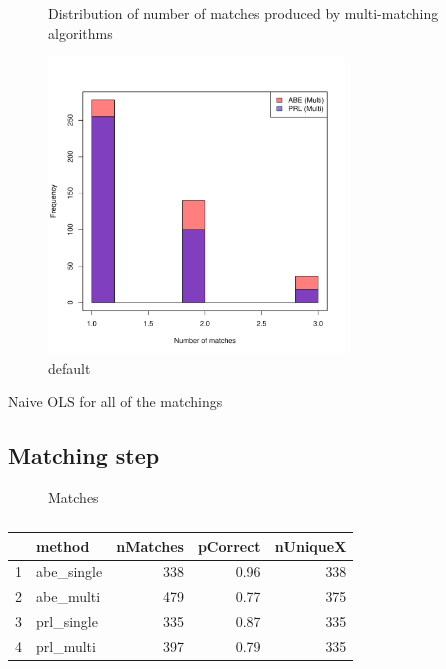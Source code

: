 \documentclass[12pt]{article}
\begin{document}
\begin{enumerate}
\begin{figure}[h!]
\begin{center}
\caption{Distribution of number of matches produced by multi-matching algorithms}
\vspace{-20pt}
\includegraphics[width=0.7\textwidth]{./Figures/match_hist.pdf}
\caption{default}
\label{default}
\end{center}
\end{figure}

\begin{table}[h!]
\let\center\empty
\let\endcenter\relax
\centering
\caption{Naive OLS for all of the matchings}
\resizebox{\textwidth}{!}{}
\end{table}

\subsection{Matching step}
\begin{figure}[htbp]
\caption{Matches}
\begin{center}


\label{default}
\end{center}
\end{figure}

\begin{table}[ht]
\centering
\caption{}
\vspace{5pt}
\begin{tabular}{rlrrr}
  \hline
 & method & nMatches & pCorrect & nUniqueX \\ 
  \hline
1 & abe\_single & 338 & 0.96 & 338 \\ 
  2 & abe\_multi & 479 & 0.77 & 375 \\ 
  3 & prl\_single & 335 & 0.87 & 335 \\ 
  4 & prl\_multi & 397 & 0.79 & 335 \\ 
   \hline
\end{tabular}
\end{table}


\end{enumerate}
\end{document}

